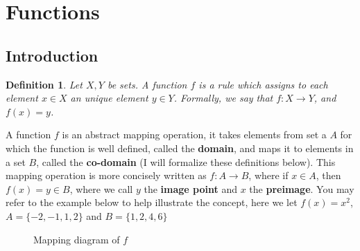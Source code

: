 \documentclass[12pt]{article}
\theoremstyle{break}
\newtheorem{defn}{Definition}[subsection]
\begin{document}
\let\ref\Cref
\section{Functions}
\subsection{Introduction}


\begin{defn}
Let $X,Y$ be sets. A function $f$ is a rule which assigns to each element $x\in X$ an \emph{unique} element $y \in Y$. Formally, we say that $f \colon X\rightarrow Y$, and $f(x) = y$.
\end{defn}

A function $f$ is an abstract mapping operation, it takes elements from set a $A$ for which the function is well defined, called the \textbf{domain}, and maps it to elements in a set $B$, called the \textbf{co-domain} (I will formalize these definitions below). This mapping operation is more concisely written as $f \colon A \rightarrow B$, where if $x\in A$, then $f(x) = y \in B$, where we call $y$ the \textbf{image point} and $x$ the \textbf{preimage}. You may refer to the example below to help illustrate the concept, here we let $f(x) = x^2$, $A = \{-2,-1,1,2\}$ and $B = \{1,2,4,6\}$


\begin{figure}[ht]
\centering
{}
\caption{Mapping diagram of $f$}
\end{figure}
\end{document}
